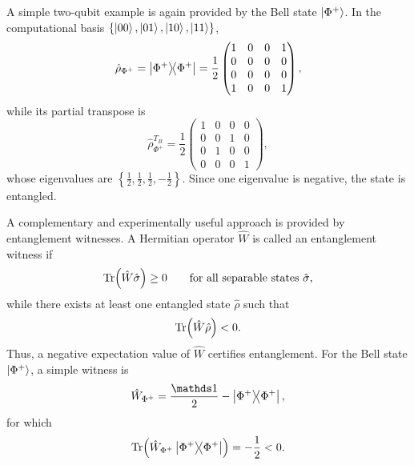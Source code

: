 A simple two-qubit example is again provided by the Bell state $\ket{\Phi^+}$. In the computational basis $\{\ket{00},\ket{01},\ket{10},\ket{11}\}$,
\begin{equation}
	\hat \rho_{\Phi^+}
	=
	\dyad{\Phi^+}{\Phi^+}
	=
	\frac{1}{2}
	\begin{pmatrix}
		1 & 0 & 0 & 1 \\
		0 & 0 & 0 & 0 \\
		0 & 0 & 0 & 0 \\
		1 & 0 & 0 & 1
	\end{pmatrix},
	\label{eq:intro_qm_phi_plus_density_matrix}
\end{equation}
while its partial transpose is
\begin{equation}
	\hat \rho_{\Phi^+}^{T_B}
	=
	\frac{1}{2}
	\begin{pmatrix}
		1 & 0 & 0 & 0 \\
		0 & 0 & 1 & 0 \\
		0 & 1 & 0 & 0 \\
		0 & 0 & 0 & 1
	\end{pmatrix},
	\label{eq:intro_qm_phi_plus_partial_transpose}
\end{equation}
whose eigenvalues are $\left\{\frac{1}{2},\frac{1}{2},\frac{1}{2},-\frac{1}{2}\right\}$. Since one eigenvalue is negative, the state is entangled.

A complementary and experimentally useful approach is provided by entanglement witnesses. A Hermitian operator $\hat W$ is called an entanglement witness if
\begin{equation}
	\Tr(\hat W \hat \sigma)\geq 0
	\qquad
	\text{for all separable states }\hat \sigma,
	\label{eq:intro_qm_entanglement_witness_definition_positive}
\end{equation}
while there exists at least one entangled state $\hat \rho$ such that
\begin{equation}
	\Tr(\hat W \hat \rho)<0.
	\label{eq:intro_qm_entanglement_witness_definition_negative}
\end{equation}
Thus, a negative expectation value of $\hat W$ certifies entanglement. For the Bell state $\ket{\Phi^+}$, a simple witness is
\begin{equation}
	\hat W_{\Phi^+}
	=
	\frac{\id}{2}-\dyad{\Phi^+}{\Phi^+},
	\label{eq:intro_qm_bell_state_witness}
\end{equation}
for which
\begin{equation}
	\Tr(\hat W_{\Phi^+}\dyad{\Phi^+}{\Phi^+})=-\frac{1}{2}<0.
	\label{eq:intro_qm_bell_state_witness_negative}
\end{equation}

